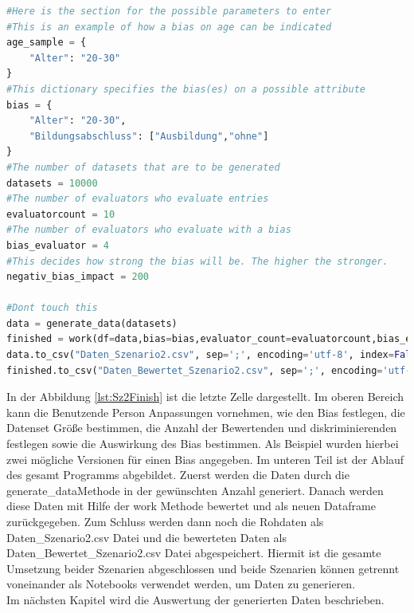 \begin{onehalfspace}
\begin{lstlisting}[language=Python,label={lst:Sz2Finish},caption=Letzte Zelle des Szenario des sozialen Punktesystems für die Interaktion des Benutzenden]
#Here is the section for the possible parameters to enter
#This is an example of how a bias on age can be indicated
age_sample = {
    "Alter": "20-30"
}
#This dictionary specifies the bias(es) on a possible attribute
bias = {
    "Alter": "20-30",
    "Bildungsabschluss": ["Ausbildung","ohne"]
}
#The number of datasets that are to be generated
datasets = 10000
#The number of evaluators who evaluate entries
evaluatorcount = 10
#The number of evaluators who evaluate with a bias
bias_evaluator = 4
#This decides how strong the bias will be. The higher the stronger.
negativ_bias_impact = 200

#Dont touch this
data = generate_data(datasets)
finished = work(df=data,bias=bias,evaluator_count=evaluatorcount,bias_evaluator=bias_evaluator,bias_neg=negativ_bias_impact)
data.to_csv("Daten_Szenario2.csv", sep=';', encoding='utf-8', index=False)
finished.to_csv("Daten_Bewertet_Szenario2.csv", sep=';', encoding='utf-8', index=False)
\end{lstlisting}
In der Abbildung \ref{lst:Sz2Finish} ist die letzte Zelle dargestellt. Im oberen Bereich kann die Benutzende Person Anpassungen vornehmen, wie den Bias festlegen, die Datenset Grö{\ss}e bestimmen, die Anzahl der Bewertenden und diskriminierenden festlegen sowie die Auswirkung des Bias bestimmen. Als Beispiel wurden hierbei zwei mögliche Versionen für einen Bias angegeben. Im unteren Teil ist der Ablauf des gesamt Programms abgebildet. Zuerst werden die Daten durch die \glqq{}generate\_data\grqq{}Methode in der gewünschten Anzahl generiert. Danach werden diese Daten mit Hilfe der \glqq{}work\grqq{} Methode bewertet und als neuen Dataframe zurückgegeben. Zum Schluss werden dann noch die Rohdaten als \glqq{}Daten\_Szenario2.csv\grqq{} Datei und die bewerteten Daten als \glqq{}Daten\_Bewertet\_Szenario2.csv\grqq{} Datei abgespeichert.
Hiermit ist die gesamte Umsetzung beider Szenarien abgeschlossen und beide Szenarien können getrennt voneinander als Notebooks verwendet werden, um Daten zu generieren.\\
Im nächsten Kapitel wird die Auswertung der generierten Daten beschrieben.
\newpage

\end{onehalfspace}
